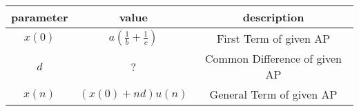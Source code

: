 
  \centering
  \begin{tabular}{|c|c|c|}
  \hline
    parameter & value & description \\
    \hline
    $x(0)$ & $a\left(\frac{1}{b} + \frac{1}{c}\right)$ & First Term of given AP \\
    \hline
    $d$ & ? & Common Difference of given AP \\
    \hline
    $x(n)$ & $(x(0) + nd)u(n)$ & General Term of given AP \\
    \hline
  \end{tabular}

